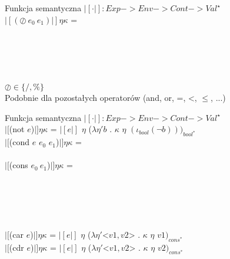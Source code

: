 \documentclass[12pt,serif]{beamer}
\begin{document}
\begin{frame}{Funkcja semantyczna}
$|[ \cdot |]: Exp -> Env -> Cont -> Val^{\star}$ \newline
\\
$|[(\oslash~e_0~e_1)|] \eta \kappa$ = \\
\hspace{1em}{$|[e_0|]$ $\eta$ ($\lambda \eta_0 n_0$ .} \\
\hspace{2em}{$|[e_1|]$ $\eta$ ($\lambda \eta_1 n_1$ .} \\
 \\
 \\
 \newline
\\
$\oslash \in \{/,\%\}$ \newline
\\
\pause
Podobnie dla pozostałych operatorów (and, or, =, <, $\leq$, ...)
\end{frame}

\begin{frame}{Funkcja semantyczna}
$|[ \cdot |]: Exp -> Env -> Cont -> Val^{\star}$ \newline
\\
$|[$(not $e$)$|] \eta \kappa$ =
  $|[e|]$ $\eta$ ($\lambda \eta' b$ . $\kappa$ $\eta$ $(\iota_{bool} (\neg b)))_{bool^{*}}$ \\
$|[$(cond $e$ $e_0$ $e_1$)$|] \eta \kappa$ = \\
 \newline
\\
$|[$(cons $e_0~e_1$)$|] \eta \kappa$ = \\
\hspace{1em}{$|[e_0|]$ $\eta$ ($\lambda \eta_0 v_0$ .} \\
\hspace{2em}{$|[e_1|]$ $\eta$ ($\lambda \eta_1 v_1$ .} \\
 \\
\hspace{2em}{)} \\
\hspace{1em}{)} \newline
\\
$|[$(car $e$)$|] \eta \kappa$ =
  $|[e|]$ $\eta$ ($\lambda \eta' $<$v1, v2$> . $\kappa$ $\eta$ $v1)_{cons^{*}}$ \\
$|[$(cdr $e$)$|] \eta \kappa$ =
  $|[e|]$ $\eta$ ($\lambda \eta' $<$v1, v2$> . $\kappa$ $\eta$ $v2)_{cons^{*}}$ \\
\end{frame}
\end{document}
